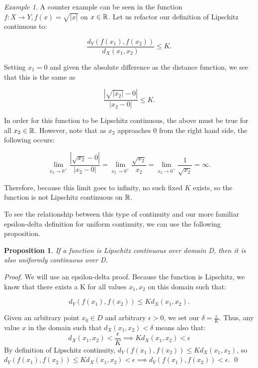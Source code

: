 \documentclass{article}
\newtheorem{proposition}[theorem]{Proposition}
\theoremstyle{remark}
\newtheorem{example}{Example}
\begin{document}
\begin{example} 
A counter example can be seen in the function $f: X \to Y,  f(x) = \sqrt{|x|}$ on $x\in \Bbb R$. Let us refactor our definition of Lipschitz continuous to: 

$$ \frac{d_Y(f(x_1), f(x_2))}{d_X(x_1, x_2)} \leq K.$$

 Setting $x_1 = 0$ and given the absolute difference as the distance function, we see that this is the same as

$$ \frac{|\sqrt{|x_2|} - 0|}{|x_2 - 0|} \leq K.$$

In order for this function to be Lipschitz continuous, the above must be true for all $x_2 \in \Bbb R $. However, note that as $x_2$ approaches 0 from the right hand side, the following occurs:

$$\lim_{x_2 \to 0^+}\frac{|\sqrt{x_2} - 0|}{|x_2 - 0|} = \lim_{x_2 \to 0^+}\frac{\sqrt{x_2}}{x_2} = \lim_{x_2 \to 0^+} \frac{1}{\sqrt{x_2}} = \infty.$$

Therefore, because this limit goes to infinity, no such fixed $K$ exists, so the function is not Lipschitz continuous on $\Bbb R$.
\end{example}


To see the relationship between this type of continuity and our more familiar epsilon-delta definition for uniform continuity, we can use the following proposition.\\

\begin{proposition}If a function is Lipschitz continuous over domain D, then it is also uniformly continuous over D.\\
\end{proposition}

\begin{proof} We will use an epsilon-delta proof. Because the function is Lipschitz, we know that there exists a K for all values $x_1, x_2$ on this domain such that:

$$d_Y(f(x_1),f(x_2)) \leq Kd_X(x_1,x_2).$$

Given an arbitrary point $x_0 \in D$ and arbitrary $\epsilon >0$, we set our $\delta = \frac{\epsilon}{K}$. Thus, any value $x$ in the domain such that $d_X(x_1,x_2)<\delta$ means also that:
$$d_X(x_1,x_2)<\frac{\epsilon}{K} \implies Kd_X(x_1,x_2)<\epsilon$$
By definition of Lipschitz continuity, $d_Y(f(x_1),f(x_2)) \leq Kd_X(x_1,x_2)$, so \\

$d_Y(f(x_1),f(x_2)) \leq Kd_X(x_1,x_2) < \epsilon \implies d_Y(f(x_1),f(x_2))< \epsilon.$ \qed
\phantom\qedhere
\end{proof}
\end{document}
